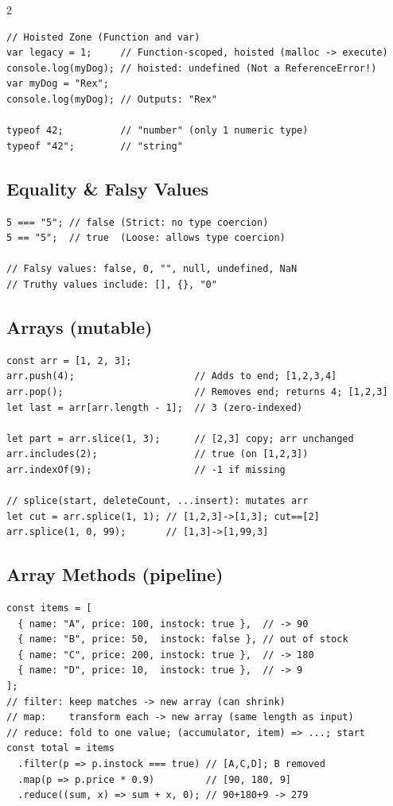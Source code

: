 \documentclass{article}
\begin{document}
\begin{multicols}{2}
\begin{lstlisting}[style=jsexam]
// Hoisted Zone (Function and var)
var legacy = 1;     // Function-scoped, hoisted (malloc -> execute)
console.log(myDog); // hoisted: undefined (Not a ReferenceError!)
var myDog = "Rex";
console.log(myDog); // Outputs: "Rex"

typeof 42;          // "number" (only 1 numeric type)
typeof "42";        // "string"
\end{lstlisting}

\subsection{Equality \& Falsy Values}
\begin{lstlisting}[style=jsexam]
5 === "5"; // false (Strict: no type coercion)
5 == "5";  // true  (Loose: allows type coercion)

// Falsy values: false, 0, "", null, undefined, NaN
// Truthy values include: [], {}, "0"
\end{lstlisting}

\subsection{Arrays (mutable)}
\begin{lstlisting}[style=jsexam]
const arr = [1, 2, 3];
arr.push(4);                     // Adds to end; [1,2,3,4]
arr.pop();                       // Removes end; returns 4; [1,2,3]
let last = arr[arr.length - 1];  // 3 (zero-indexed)

let part = arr.slice(1, 3);      // [2,3] copy; arr unchanged
arr.includes(2);                 // true (on [1,2,3])
arr.indexOf(9);                  // -1 if missing

// splice(start, deleteCount, ...insert): mutates arr
let cut = arr.splice(1, 1); // [1,2,3]->[1,3]; cut==[2]
arr.splice(1, 0, 99);       // [1,3]->[1,99,3]
\end{lstlisting}

\subsection{Array Methods (pipeline)}
\begin{lstlisting}[style=jsexam]
const items = [
  { name: "A", price: 100, instock: true },  // -> 90
  { name: "B", price: 50,  instock: false }, // out of stock
  { name: "C", price: 200, instock: true },  // -> 180
  { name: "D", price: 10,  instock: true },  // -> 9
];
// filter: keep matches -> new array (can shrink)
// map:    transform each -> new array (same length as input)
// reduce: fold to one value; (accumulator, item) => ...; start
const total = items
  .filter(p => p.instock === true) // [A,C,D]; B removed
  .map(p => p.price * 0.9)         // [90, 180, 9]
  .reduce((sum, x) => sum + x, 0); // 90+180+9 -> 279 


\end{lstlisting}
\end{multicols}
\end{document}
